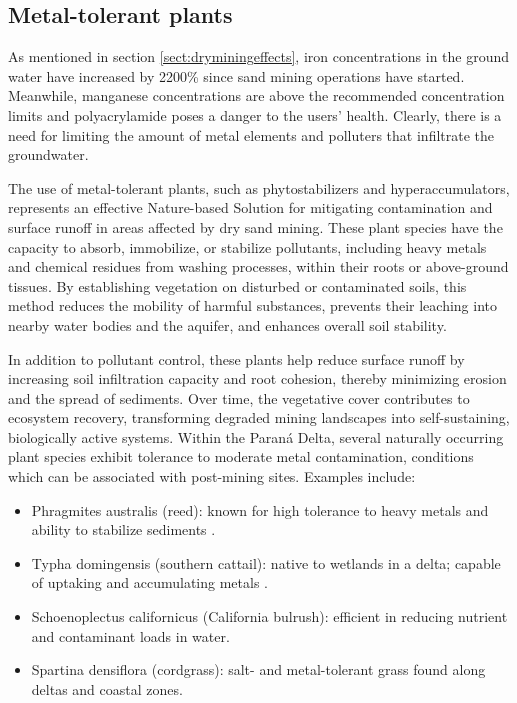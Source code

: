 \subsection{Metal-tolerant plants}
As mentioned in section \ref{sect:dryminingeffects}, iron concentrations in the ground water have increased by 2200\% since sand mining operations have started. Meanwhile, manganese concentrations are above the recommended concentration limits and polyacrylamide poses a danger to the users' health. Clearly, there is a need for limiting the amount of metal elements and polluters that infiltrate the groundwater.

The use of metal-tolerant plants, such as phytostabilizers and hyperaccumulators, represents an effective Nature-based Solution for mitigating contamination and surface runoff in areas affected by dry sand mining. These plant species have the capacity to absorb, immobilize, or stabilize pollutants, including heavy metals and chemical residues from washing processes, within their roots or above-ground tissues. By establishing vegetation on disturbed or contaminated soils, this method reduces the mobility of harmful substances, prevents their leaching into nearby water bodies and the aquifer, and enhances overall soil stability.

In addition to pollutant control, these plants help reduce surface runoff by increasing soil infiltration capacity and root cohesion, thereby minimizing erosion and the spread of sediments. Over time, the vegetative cover contributes to ecosystem recovery, transforming degraded mining landscapes into self-sustaining, biologically active systems.
Within the Paraná Delta, several naturally occurring plant species exhibit tolerance to moderate metal contamination, conditions which can be associated with post-mining sites. Examples include:

\begin{itemize}
    \item Phragmites australis (reed): known for high tolerance to heavy metals and ability to stabilize sediments \autocite{popaHeavyMetalsAccumulation2023}.
    \item Typha domingensis (southern cattail): native to wetlands in a delta; capable of uptaking and accumulating metals \autocite{solimanTyphaDomingensisPers2024}.
    \item Schoenoplectus californicus (California bulrush): efficient in reducing nutrient and contaminant loads in water.
    \item Spartina densiflora (cordgrass): salt- and metal-tolerant grass found along deltas and coastal zones.
\end{itemize}

